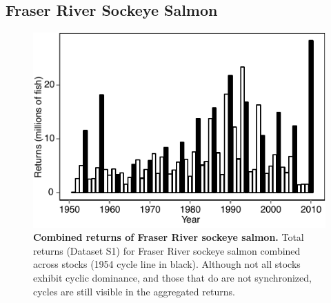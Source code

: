 \subsection{Fraser River Sockeye Salmon}

\begin{figure}[!ht]
\begin{center}\includegraphics[width=\maxwidth{\textwidth}]{fig_salmon_2.pdf}\end{center}
\caption[Combined returns of Fraser River sockeye salmon.]{\textbf{Combined returns of Fraser River sockeye salmon.}\newline
Total returns (Dataset S1) for Fraser River sockeye salmon combined across stocks (1954 cycle line in black). Although not all stocks exhibit cyclic dominance, and those that do are not synchronized, cycles are still visible in the aggregated returns.}
\label{fig_salmon_returns}
\end{figure}

